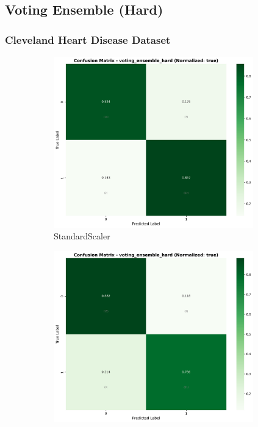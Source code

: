 \FloatBarrier

\subsection{Voting Ensemble (Hard)}\label{subsec:voting-hard}

\subsubsection{Cleveland Heart Disease Dataset}\label{subsubsec:voting-cleveland}

\begin{figure}[H]\centering
\begin{subfigure}[b]{0.31\textwidth}\centering
\includegraphics[width=0.95\textwidth]{Result/cleveland_dataset/confusion_matrices/voting_ensemble_hard_numeric_dataset_StandardScaler.png}
\caption{StandardScaler}\label{fig:voting_clev_cm_standard}
\end{subfigure}\hfill
\begin{subfigure}[b]{0.31\textwidth}\centering
\includegraphics[width=0.95\textwidth]{Result/cleveland_dataset/confusion_matrices/voting_ensemble_hard_numeric_dataset_MinMaxScaler.png}

\end{subfigure}
\end{figure}
